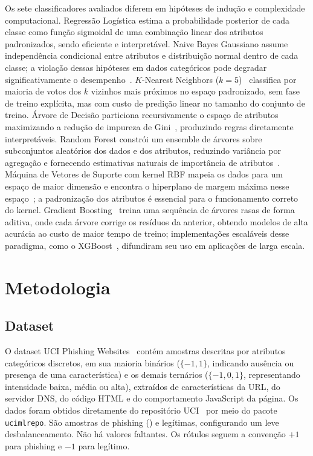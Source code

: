 \documentclass[12pt]{article}
\begin{document}
Os sete classificadores avaliados diferem em hipóteses de indução e
complexidade computacional. Regressão Logística estima a probabilidade
posterior de cada classe como função sigmoidal de uma combinação linear dos
atributos padronizados, sendo eficiente e interpretável. Naive Bayes Gaussiano
assume independência condicional entre atributos e distribuição normal dentro
de cada classe; a violação dessas hipóteses em dados categóricos pode degradar
significativamente o desempenho~\cite{demsar2006}. $K$-Nearest Neighbors
($k=5$)~\cite{cover1967} classifica por maioria de votos dos $k$ vizinhos mais
próximos no espaço padronizado, sem fase de treino explícita, mas com custo de
predição linear no tamanho do conjunto de treino. Árvore de Decisão particiona
recursivamente o espaço de atributos maximizando a redução de impureza de
Gini~\cite{breiman1984}, produzindo regras diretamente interpretáveis. Random Forest constrói
um ensemble de árvores sobre subconjuntos aleatórios dos dados e dos atributos,
reduzindo variância por agregação e fornecendo estimativas naturais de
importância de atributos~\cite{breiman2001}. Máquina de Vetores de Suporte
com kernel RBF mapeia os dados para um espaço de maior dimensão e encontra
o hiperplano de margem máxima nesse espaço~\cite{cortes1995}; a padronização
dos atributos é essencial para o funcionamento correto do kernel. Gradient
Boosting~\cite{friedman2001} treina uma sequência de árvores rasas de forma
aditiva, onde cada árvore corrige os resíduos da anterior, obtendo modelos de
alta acurácia ao custo de maior tempo de treino; implementações escaláveis
desse paradigma, como o XGBoost~\cite{chen2016}, difundiram seu uso em
aplicações de larga escala.

\section{Metodologia}

\subsection{Dataset}

O dataset UCI Phishing Websites~\cite{mohammad2012} contém \nTotal{} amostras
descritas por \nFeatures{} atributos categóricos discretos, em sua maioria
binários ($\{-1, 1\}$, indicando ausência ou presença de uma característica) e
os demais ternários ($\{-1, 0, 1\}$, representando intensidade baixa, média ou
alta), extraídos de características da URL, do servidor DNS, do
código HTML e do comportamento JavaScript da página. Os dados foram obtidos
diretamente do repositório UCI~\cite{ucimlrepo} por meio do pacote
\texttt{ucimlrepo}. São \nPhishing{} amostras
de phishing (\pctPhishing{}) e \nLegitimo{} legítimas, configurando um leve
desbalanceamento. Não há valores faltantes. Os rótulos seguem a convenção
$+1$ para phishing e $-1$ para legítimo.
\end{document}
